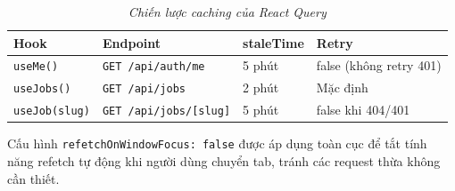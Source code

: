 \begin{table}[H]
    \centering
    \renewcommand{\arraystretch}{1.4}
    \begin{tabular}{|l|l|l|l|}
        \hline
        \textbf{Hook} & \textbf{Endpoint} & \textbf{staleTime} & \textbf{Retry} \\ \hline
        \texttt{useMe()} & \texttt{GET /api/auth/me} & 5 phút & false (không retry 401) \\ \hline
        \texttt{useJobs()} & \texttt{GET /api/jobs} & 2 phút & Mặc định \\ \hline
        \texttt{useJob(slug)} & \texttt{GET /api/jobs/[slug]} & 5 phút & false khi 404/401 \\ \hline
    \end{tabular}
    \caption{\textit{Chiến lược caching của React Query}}
    \label{tab:caching}
\end{table}

Cấu hình \texttt{refetchOnWindowFocus: false} được áp dụng toàn cục để tắt tính năng refetch tự động khi người dùng chuyển tab, tránh các request thừa không cần thiết.
